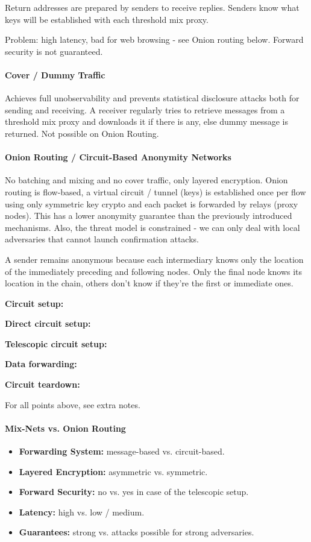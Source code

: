 Return addresses are prepared by senders to receive replies. Senders know what keys will be established with each threshold mix proxy.

Problem: high latency, bad for web browsing - see Onion routing below. Forward security is not guaranteed.

\paragraph{Cover / Dummy Traffic}
Achieves full unobservability and prevents statistical disclosure attacks both for sending and receiving. A receiver regularly tries to retrieve messages from a threshold mix proxy and downloads it if there is any, else dummy message is returned. Not possible on Onion Routing.

\paragraph{Onion Routing / Circuit-Based Anonymity Networks}
No batching and mixing and no cover traffic, only layered encryption. Onion routing is flow-based, a virtual circuit / tunnel (keys) is established once per flow using only symmetric key crypto and each packet is forwarded by relays (proxy nodes). This has a lower anonymity guarantee than the previously introduced mechanisms. Also, the threat model is constrained - we can only deal with local adversaries that cannot launch confirmation attacks.

A sender remains anonymous because each intermediary knows only the location of the immediately preceding and following nodes. Only the final node knows its location in the chain, others don't know if they're the first or immediate ones.

\textbf{Circuit setup:} 

\textbf{Direct circuit setup:} 

\textbf{Telescopic circuit setup:} 

\textbf{Data forwarding:} 

\textbf{Circuit teardown:}

For all points above, see extra notes.

\paragraph{Mix-Nets vs. Onion Routing}
\begin{itemize}
    \item \textbf{Forwarding System:} message-based vs. circuit-based.
    \item \textbf{Layered Encryption:} asymmetric vs. symmetric.
    \item \textbf{Forward Security:} no vs. yes in case of the telescopic setup.
    \item \textbf{Latency:} high vs. low / medium.
    \item \textbf{Guarantees:} strong vs. attacks possible for strong adversaries.
\end{itemize}

